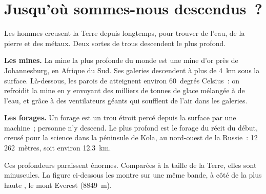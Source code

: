 \section{Jusqu'où sommes-nous descendus~?}

Les hommes creusent la Terre depuis longtemps, pour trouver de l'eau, de
la pierre et des métaux. Deux sortes de trous descendent le plus profond.

\textbf{Les mines.} La mine la plus profonde du monde est une mine d'or
près de Johannesburg, en Afrique du Sud. Ses galeries descendent à plus de
4~km sous la surface. Là-dessous, les parois de  atteignent environ
60~degrés Celsius~: on refroidit la mine en y envoyant des milliers de
tonnes de glace mélangée à de l'eau, et grâce à des ventilateurs géants
qui soufflent de l'air dans les galeries.

\textbf{Les forages.} Un forage est un trou étroit percé depuis la surface
par une machine~; personne n'y descend. Le plus profond est le forage du
récit du début, creusé pour la science dans la péninsule de Kola, au
nord-ouest de la Russie~: 12\,262~mètres, soit environ 12.3~km.

Ces profondeurs paraissent énormes. Comparées à la taille de la Terre,
elles sont minuscules. La figure ci-dessous les montre sur une même bande,
à côté de la plus haute , le mont Everest (8849~m).

